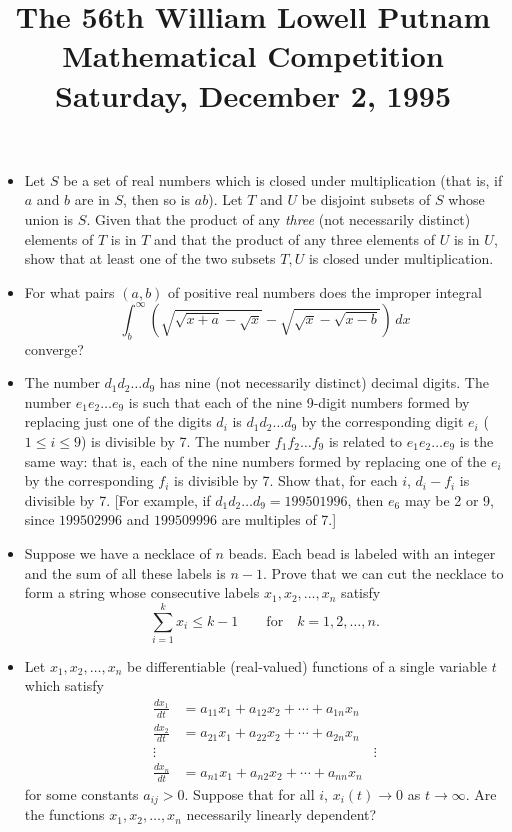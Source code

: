 \documentclass[amssymb,twocolumn,pra,10pt,aps]{revtex4-1}
\begin{document}
\title{The 56th William Lowell Putnam Mathematical Competition \\
    Saturday, December 2, 1995\vspace{-2\baselineskip}}
\maketitle

\begin{itemize}
\item[A--1] Let $S$ be a set of real numbers which is closed under
multiplication (that is, if $a$ and $b$ are in $S$, then so is $ab$).
Let $T$ and $U$ be disjoint subsets of $S$ whose union is $S$. Given
that the product of any {\em three} (not necessarily distinct)
elements of $T$ is in $T$ and that the product of any three elements
of $U$ is in $U$, show that at least one of the two subsets $T,U$ is
closed under multiplication.

\item[A--2] For what pairs $(a,b)$ of positive real numbers does the
improper integral
\[
\int_{b}^{\infty} \left( \sqrt{\sqrt{x+a}-\sqrt{x}} -
\sqrt{\sqrt{x}-\sqrt{x-b}} \right)\,dx
\]
converge?

\item[A--3] The number $d_{1}d_{2}\dots d_{9}$ has nine (not
necessarily distinct) decimal digits. The number $e_{1}e_{2}\dots
e_{9}$ is such that each of the nine 9-digit numbers formed by
replacing just one of the digits $d_{i}$ is $d_{1}d_{2}\dots d_{9}$
by the corresponding digit $e_{i}$ ($1 \leq i \leq 9$) is divisible
by 7. The number $f_{1}f_{2}\dots f_{9}$ is related to
$e_{1}e_{2}\dots e_{9}$ is the same way: that is, each of the nine
numbers formed by replacing one of the $e_{i}$ by the corresponding
$f_{i}$ is divisible by 7. Show that, for each $i$, $d_{i}-f_{i}$ is
divisible by 7. [For example, if $d_{1}d_{2}\dots d_{9} = 199501996$,
then $e_{6}$ may be 2 or 9, since $199502996$ and $199509996$ are
multiples of 7.]

\item[A--4] Suppose we have a necklace of $n$ beads. Each bead is
labeled with an integer and the sum of all these labels is $n-1$.
Prove that we can cut the necklace to form a string whose
consecutive labels $x_{1},x_{2},\dots,x_{n}$ satisfy
\[
\sum_{i=1}^{k} x_{i} \leq k-1 \qquad \mbox{for} \quad k=1,2,\dots,n.
\]

\item[A--5] Let $x_{1},x_{2},\dots,x_{n}$ be differentiable
(real-valued) functions of a single variable $t$ which satisfy
\begin{align*}
\frac{dx_{1}}{dt} &= a_{11}x_{1} + a_{12}x_{2} + \cdots +
a_{1n}x_{n} \\
\frac{dx_{2}}{dt} &= a_{21}x_{1} + a_{22}x_{2} + \cdots +
a_{2n}x_{n} \\
\vdots && \vdots \\
\frac{dx_{n}}{dt} &= a_{n1}x_{1} + a_{n2}x_{2} + \cdots +
a_{nn}x_{n}
\end{align*}
for some constants $a_{ij}>0$. Suppose that for all $i$, $x_{i}(t)
\to 0$ as $t \to \infty$. Are the functions $x_{1},x_{2},\dots,x_{n}$
necessarily linearly dependent?


\end{itemize}
\end{document}

